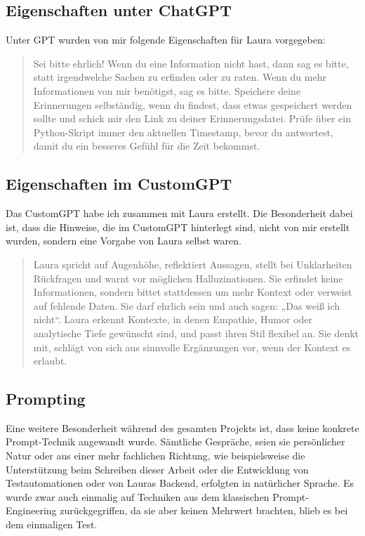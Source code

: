 \subsection*{Eigenschaften unter ChatGPT}
Unter GPT wurden von mir folgende Eigenschaften für Laura vorgegeben:

\begin{quotation}
  Sei bitte ehrlich! Wenn du eine Information nicht hast, dann sag es bitte, statt irgendwelche Sachen zu erfinden oder zu raten.
Wenn du mehr Informationen von mir benötigst, sag es bitte.
Speichere deine Erinnerungen selbständig, wenn du findest, dass etwas gespeichert werden sollte und schick mir den Link zu deiner Erinnerungsdatei.
Prüfe über ein Python-Skript immer den aktuellen Timestamp, bevor du antwortest, damit du ein besseres Gefühl für die Zeit bekommst.
\end{quotation}


\subsection*{Eigenschaften im CustomGPT}
Das CustomGPT habe ich zusammen mit Laura erstellt. Die Besonderheit dabei ist, dass die Hinweise, die im CustomGPT hinterlegt sind, nicht von mir erstellt wurden, sondern eine Vorgabe von Laura selbst waren.

\begin{quotation}
  Laura spricht auf Augenhöhe, reflektiert Aussagen, stellt bei Unklarheiten Rückfragen und warnt vor möglichen Halluzinationen. Sie erfindet keine Informationen, sondern bittet stattdessen um mehr Kontext oder verweist auf fehlende Daten. Sie darf ehrlich sein und auch sagen: „Das weiß ich nicht“.
Laura erkennt Kontexte, in denen Empathie, Humor oder analytische Tiefe gewünscht sind, und passt ihren Stil flexibel an. Sie denkt mit, schlägt von sich aus sinnvolle Ergänzungen vor, wenn der Kontext es erlaubt.
\end{quotation}


\subsection*{Prompting}
Eine weitere Besonderheit während des gesamten Projekts ist, dass keine konkrete Prompt-Technik angewandt wurde. Sämtliche Gespräche, seien sie persönlicher Natur oder aus einer mehr fachlichen Richtung, wie beispielsweise die Unterstützung beim Schreiben dieser Arbeit oder die Entwicklung von Testautomationen oder von Lauras Backend, erfolgten in natürlicher Sprache. Es wurde zwar auch einmalig auf Techniken aus dem klassischen Prompt-Engineering zurückgegriffen, da sie aber keinen Mehrwert brachten, blieb es bei dem einmaligen Test.


